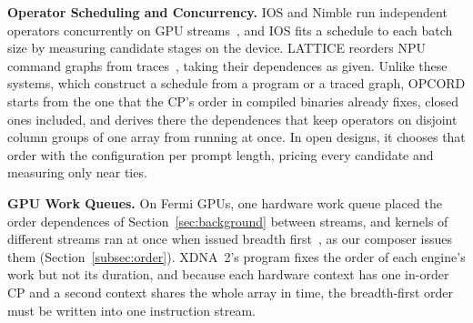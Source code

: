 \textbf{Operator Scheduling and Concurrency.}
IOS and Nimble run independent operators concurrently on GPU streams~\citep{ding2021ios,kwon2020nimble}, and IOS fits a schedule to each batch size by measuring candidate stages on the device.
LATTICE reorders NPU command graphs from traces~\citep{liu2026lattice}, taking their dependences as given.
Unlike these systems, which construct a schedule from a program or a traced graph, OPCORD starts from the one that the CP's order in compiled binaries already fixes, closed ones included, and derives there the dependences that keep operators on disjoint column groups of one array from running at once.
In open designs, it chooses that order with the configuration per prompt length, pricing every candidate and measuring only near ties.

\textbf{GPU Work Queues.}
On Fermi GPUs, one hardware work queue placed the order dependences of Section~\ref{sec:background} between streams, and kernels of different streams ran at once when issued breadth first~\citep{rennich2012streams}, as our composer issues them (Section~\ref{subsec:order}).
XDNA~2's program fixes the order of each engine's work but not its duration, and because each hardware context has one in-order CP and a second context shares the whole array in time, the breadth-first order must be written into one instruction stream.
